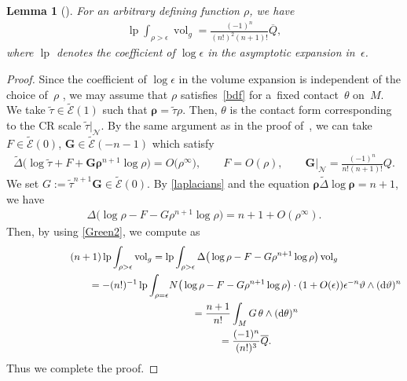 \documentclass[pdftex]{sigma}
\numberwithin{equation}{section}
\newtheorem{Lemma}[Theorem]{Lemma}
\begin{document}
\begin{Lemma}[{\cite[Proposition~A.3]{Seshadri}}]\label{Q-lp}
For an arbitrary defining function $\rho$, we have
\begin{gather*}
\operatorname{lp}\int_{\rho>\epsilon} \operatorname{vol}_g=\frac{(-1)^n}{(n!)^2(n+1)!}\overline{Q},
\end{gather*}
where $\operatorname{lp}$ denotes the coefficient of $\log\epsilon$ in the asymptotic expansion in~$\epsilon$.
\end{Lemma}
\begin{proof}
Since the coef\/f\/icient of $\log\epsilon$ in the volume expansion is independent of the choice of~$\rho$ \cite[Proposition~4.1]{Seshadri}, we may assume that $\rho$ satisf\/ies~\eqref{bdf} for a~f\/ixed contact~$\theta$ on~$M$. We take $\widetilde\tau\in\widetilde{\mathcal{E}}(1)$ such that $\boldsymbol\rho=\widetilde\tau\rho$. Then, $\theta$ is the contact form corresponding to the CR scale $\widetilde\tau|_{\mathcal{N}}$.
By the same argument as in the proof of~\cite[Lemma~3.1]{Hirachi}, we can take $F\in\widetilde{\mathcal{E}}(0)$, $\boldsymbol{G}\in\widetilde{\mathcal{E}} (-n-1)$ which satisfy
\begin{gather*}
\widetilde{\Delta}\big(\log\widetilde\tau+F+\boldsymbol{G}\boldsymbol{\rho}^{n+1}\log\rho\big)=O\big(\rho^\infty\big), \qquad
F=O(\rho), \qquad \boldsymbol{G}|_\mathcal{N}=\frac{(-1)^n}{n!(n+1)!}Q.
\end{gather*}
We set $G:=\widetilde{\tau}^{n+1}\boldsymbol{G}\in\widetilde{\mathcal{E}}(0)$. By \eqref{laplacians} and the equation $\boldsymbol\rho\widetilde\Delta\log\boldsymbol\rho=n+1$, we have
\begin{gather*}
\Delta\big(\log\rho-F-G\rho^{n+1}\log\rho\big)=n+1+O(\rho^\infty).
\end{gather*}
Then, by using \eqref{Green2}, we compute as
\begin{gather*}
(n+1) \operatorname{lp}\int_{\rho>\epsilon} \operatorname{vol}_g
 =\operatorname{lp}\int_{\rho>\epsilon}\Delta\big(\log\rho-F-G\rho^{n+1}\log\rho\big)\operatorname{vol}_g \\
\hphantom{(n+1) \operatorname{lp}\int_{\rho>\epsilon} \operatorname{vol}_g}{}
=-(n!)^{-1}\operatorname{lp}\int_{\rho=\epsilon}\! N\big(\log\rho-F-G\rho^{n+1}\log\rho\big) \cdot (1+O(\epsilon))\epsilon^{-n} \vartheta\wedge({\rm d}\vartheta)^n \\
\hphantom{(n+1) \operatorname{lp}\int_{\rho>\epsilon} \operatorname{vol}_g}{}
=\frac{n+1}{n!}\int_M G\,\theta\wedge({\rm d}\theta)^n \\
\hphantom{(n+1) \operatorname{lp}\int_{\rho>\epsilon} \operatorname{vol}_g}{}
=\frac{(-1)^n}{(n!)^3} \overline{Q}.
\end{gather*}
Thus we complete the proof.
\end{proof}
\end{document}
